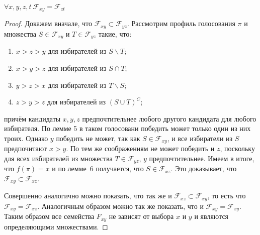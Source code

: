 \begin{lemma}
$\forall x, y, z, t\ \mathcal{F}_{xy} = \mathcal{F}_{zt}$
\end{lemma}
\begin{proof}
Докажем вначале, что $\mathcal{F}_{xy}\subset\mathcal{F}_{yz}$. Рассмотрим профиль голосования $\pi$ и множества $S\in \mathcal{F}_{xy}$ и $T\in\mathcal{F}_{yz}$ такие, что:
\begin{enumerate}
\item $x > z > y$ для избирателей из $S\backslash T$;
\item $x>y>z$ для избирателей из $S\cap T$;
\item $y>z>x$ для избирателей из $T\backslash S$;
\item $z>y>z$ для избирателей из $(S\cup T)^C$;
\end{enumerate}
причём кандидаты $x, y, z$ предпочтительнее любого другого кандидата для любого избирателя. По лемме 5 в таком голосовани победить может только один из них троих. Однако $y$ победить не может, так как $S\in\mathcal{F}_{xy}$, и все избиратели из $S$ предпочитают $x>y$. По тем же соображениям не может победить и $z$, поскольку для всех избирателей из множества $T\in\mathcal{F}_{yz}$, $y$ предпочтительнее. Имеем в итоге, что $f(\pi)=x$ и по лемме~6 получается, что $S\in\mathcal{F}_{xz}$. Это доказывает, что $\mathcal{F}_{xy}\subset\mathcal{F}_{xz}$.

Совершенно аналогично можно показать, что так же и $\mathcal{F}_{xz}\subset\mathcal{F}_{xy}$, то есть что $\mathcal{F}_{xy}=\mathcal{F}_{xz}$. Аналогичным образом можно так же показать, что и $\mathcal{F}_{xy}=\mathcal{F}_{xy}$. Таким образом все семейства $F_{xy}$ не зависят от выбора $x$ и $y$ и являются определяющими множествами.
\end{proof}

